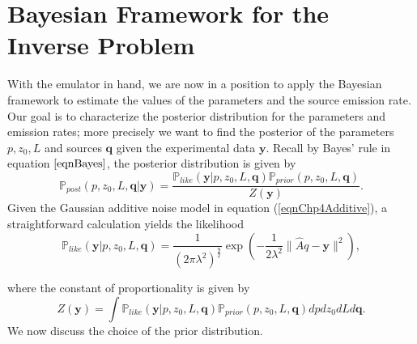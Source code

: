 \documentclass{sfuthesis}
\newcommand{\post}{\mathbb{P}_{post}}
\newcommand{\like}{\mathbb{P}_{like}}
\newcommand{\prior}{\mathbb{P}_{prior}}
\newcommand{\q}{\textbf{q}}
\newcommand{\pars}{p,z_{0},L}
\newcommand{\y}{\textbf{y}}
\begin{document}
\section{Bayesian Framework for the Inverse Problem}

With the emulator in hand, we are now in a position to apply
the Bayesian framework to estimate the values of the parameters and the source emission rate. 
Our goal is to characterize the posterior distribution for the
parameters and emission rates; more precisely
we want to find the posterior
of the parameters $\pars$ and sources $\q$ given
the experimental data $\y$. Recall by Bayes' rule in equation $\eqref{eqnBayes}$, the posterior
distribution is given by
\begin{equation}\label{eqnBayesChp4}
\post(p,z_{0},L,\q|\y)=\frac{\like(\y|p,z_{0},L,\q)\prior(p,z_{0},L,\q)}{Z(\y)}.
\end{equation}
Given the Gaussian additive noise model in equation (\ref{eqnChp4Additive}),  a straightforward calculation yields
the likelihood 
\begin{equation}\label{eqnFinalLike}
\like(\y|\pars,\q)=\frac{1}{(2\pi\lambda^{2})^{\frac{9}{2}}}\exp\left(-\frac{1}{2\lambda^{2}}\|\widehat{A}q-\y\|^{2}\right),
\end{equation}




\noindent where the constant of proportionality is given by
\begin{equation}\label{eqnPropConst}
Z(\y)=\int\like(\y|p,z_{0},L,\q)\prior(p,z_{0},L,\q)dpdz_{0}dLd\q.
\end{equation}
We now discuss the choice of the prior distribution.
\end{document}
